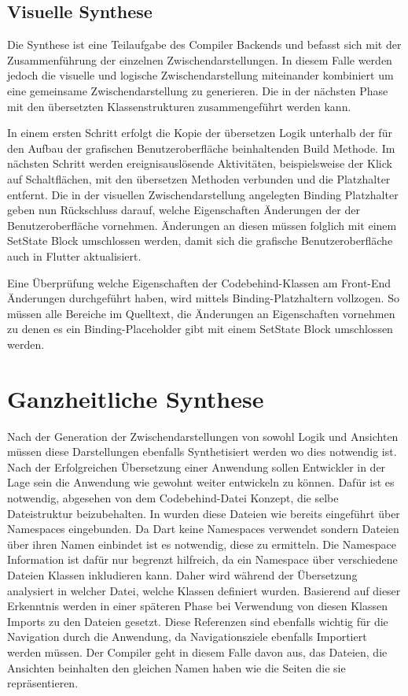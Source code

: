 \subsection{Visuelle Synthese}

Die Synthese ist eine Teilaufgabe des Compiler Backends und befasst sich mit der Zusammenführung der einzelnen Zwischendarstellungen.  In diesem Falle werden jedoch die visuelle und logische Zwischendarstellung miteinander kombiniert um eine gemeinsame Zwischendarstellung zu generieren.  Die in der nächsten Phase mit den übersetzten Klassenstrukturen zusammengeführt werden kann. 

In einem ersten Schritt erfolgt die Kopie der übersetzen Logik unterhalb der für den Aufbau der grafischen Benutzeroberfläche beinhaltenden Build Methode.  Im nächsten Schritt werden ereignisauslösende Aktivitäten,  beispielsweise der Klick auf Schaltflächen,  mit den übersetzen Methoden verbunden und die Platzhalter entfernt.  Die in der visuellen Zwischendarstellung angelegten Binding Platzhalter geben nun Rückschluss darauf,  welche Eigenschaften Änderungen der der Benutzeroberfläche vornehmen.  Änderungen an diesen müssen folglich mit einem SetState Block umschlossen werden, damit sich die grafische Benutzeroberfläche auch in Flutter aktualisiert. 

Eine Überprüfung welche Eigenschaften der Codebehind-Klassen am Front-End Änderungen durchgeführt haben, wird mittels Binding-Platzhaltern vollzogen.  So müssen alle Bereiche im Quelltext, die Änderungen an Eigenschaften vornehmen zu denen es ein Binding-Placeholder gibt mit einem SetState Block umschlossen werden.

\section{Ganzheitliche Synthese}
Nach der Generation der Zwischendarstellungen von sowohl Logik und Ansichten müssen diese Darstellungen ebenfalls Synthetisiert werden wo dies notwendig ist.  Nach der Erfolgreichen Übersetzung einer Anwendung sollen Entwickler in der Lage sein die Anwendung wie gewohnt weiter entwickeln zu können.  Dafür ist es notwendig,  abgesehen von dem Codebehind-Datei Konzept,  die selbe Dateistruktur beizubehalten.  In \Csharp wurden diese Dateien wie bereits eingeführt über Namespaces eingebunden.  Da Dart keine Namespaces verwendet sondern Dateien über ihren Namen einbindet ist es notwendig,  diese zu ermitteln.  Die Namespace Information ist dafür nur begrenzt hilfreich,  da ein Namespace über verschiedene Dateien Klassen inkludieren kann.  Daher wird während der Übersetzung analysiert in welcher Datei,  welche Klassen definiert wurden.  Basierend auf dieser Erkenntnis werden in einer späteren Phase bei Verwendung von diesen Klassen Imports zu den Dateien gesetzt.  Diese Referenzen sind ebenfalls wichtig für die Navigation durch die Anwendung,  da Navigationsziele ebenfalls Importiert werden müssen.  Der Compiler geht in diesem Falle davon aus,  das Dateien, die Ansichten beinhalten den gleichen Namen haben wie die Seiten die sie repräsentieren.


